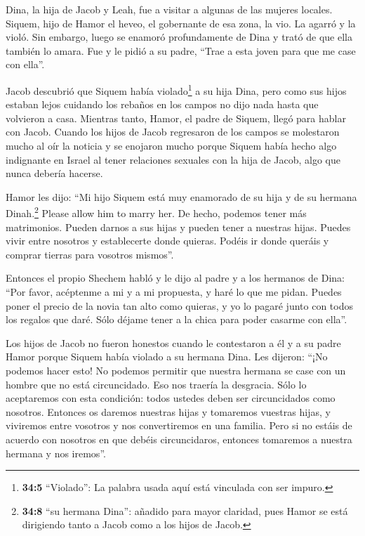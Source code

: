  Dina, la hija de Jacob y Leah, fue a visitar a algunas de
las mujeres locales.  Siquem, hijo de Hamor el heveo, el
gobernante de esa zona, la vio. La agarró y la violó.  Sin
embargo, luego se enamoró profundamente de Dina y trató de que ella
también lo amara.  Fue y le pidió a su padre, ``Trae a esta
joven para que me case con ella''.

 Jacob descubrió que Siquem había violado\footnote{\textbf{34:5}
  ``Violado'': La palabra usada aquí está vinculada con ser impuro.} a
su hija Dina, pero como sus hijos estaban lejos cuidando los rebaños en
los campos no dijo nada hasta que volvieron a casa. 
Mientras tanto, Hamor, el padre de Siquem, llegó para hablar con Jacob.
 Cuando los hijos de Jacob regresaron de los campos se
molestaron mucho al oír la noticia y se enojaron mucho porque Siquem
había hecho algo indignante en Israel al tener relaciones sexuales con
la hija de Jacob, algo que nunca debería hacerse.

 Hamor les dijo: ``Mi hijo Siquem está muy enamorado de su
hija y de su hermana Dinah.\footnote{\textbf{34:8} ``su hermana Dina'':
  añadido para mayor claridad, pues Hamor se está dirigiendo tanto a
  Jacob como a los hijos de Jacob.} Please allow him to marry her.
 De hecho, podemos tener más matrimonios. Pueden darnos a
sus hijas y pueden tener a nuestras hijas.  Puedes vivir
entre nosotros y establecerte donde quieras. Podéis ir donde queráis y
comprar tierras para vosotros mismos''.

 Entonces el propio Shechem habló y le dijo al padre y a
los hermanos de Dina: ``Por favor, acéptenme a mi y a mi propuesta, y
haré lo que me pidan.  Puedes poner el precio de la novia
tan alto como quieras, y yo lo pagaré junto con todos los regalos que
daré. Sólo déjame tener a la chica para poder casarme con ella''.

 Los hijos de Jacob no fueron honestos cuando le
contestaron a él y a su padre Hamor porque Siquem había violado a su
hermana Dina.  Les dijeron: ``¡No podemos hacer esto! No
podemos permitir que nuestra hermana se case con un hombre que no está
circuncidado. Eso nos traería la desgracia.  Sólo lo
aceptaremos con esta condición: todos ustedes deben ser circuncidados
como nosotros.  Entonces os daremos nuestras hijas y
tomaremos vuestras hijas, y viviremos entre vosotros y nos convertiremos
en una familia.  Pero si no estáis de acuerdo con nosotros
en que debéis circuncidaros, entonces tomaremos a nuestra hermana y nos
iremos''.

